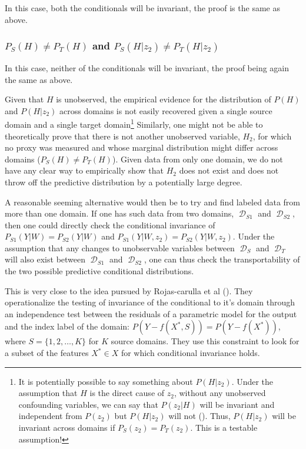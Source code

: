 \documentclass[a4paper,12pt]{article}
\DeclareMathOperator*{\D}{\mathcal{D}}
\begin{document}
In this case, both the conditionals will be invariant, the proof is the same as above.

\subsubsection*{$P_S(H) \neq P_T(H)$ and $P_S(H|z_2) \neq P_T(H|z_2)$} 

In this case, neither of the conditionals will be invariant, the proof being again the same as above. 

Given that $H$ is unobserved, the empirical evidence for the distribution of $P(H)$ and $P(H|z_2)$ across domains is not easily recovered given a single source domain and a single target domain\footnote{It is potentially possible to say something about $P(H|z_2)$. Under the assumption that $H$ is the direct cause of $z_2$, without any unobserved confounding variables, we can say that $P(z_2|H)$ will be invariant and independent from $P(z_2)$ but $P(H|z_2)$ will not (\cite[see][for an exposition of this feature which is closely related to weak exogoneity but not directly proved by it]{Daniusis2010, Sch2012, Peters2017}). Thus, $P(H|z_2)$ will be invariant across domains if $P_S(z_2) = P_T(z_2)$. This is a testable assumption!} Similarly, one might not be able to theoretically prove that there is not another unobserved variable, $H_2$, for which no proxy was measured and whose marginal distribution might differ across domains ($P_S(H) \neq P_T(H)$). Given data from only one domain, we do not have any clear way to empirically show that $H_2$ does not exist and does not throw off the predictive distribution by a potentially large degree. 

A reasonable seeming alternative would then be to try and find labeled data from more than one domain. If one has such data from two domains, $\D_{S1}$ and $\D_{S2}$, then one could directly check the conditional invariance of $P_{S1}(Y|W) = P_{S2}(Y|W)$ and $P_{S1}(Y|W,z_2) = P_{S2}(Y|W,z_2)$. Under the assumption that any changes to unobservable variables between $\D_S$  and $\D_T$ will also exist between $\D_{S1}$ and $\D_{S2}$, one can thus check the transportability of the two possible predictive conditional distributions. 

This is very close to the idea pursued by Rojas-carulla et al (\cite{Rojas-carulla2018}). They operationalize the testing of invariance of the conditional to it's domain through an independence test between the residuals of a parametric model for the output and the index label of the domain: $P(Y - f(X^*, S)) = P(Y - f(X^*))$, where $S = \{1,2,\ldots,K \}$ for $K$ source domains. They use this constraint to look for a subset of the features $X^* \in X$ for which conditional invariance holds. 
\end{document}

